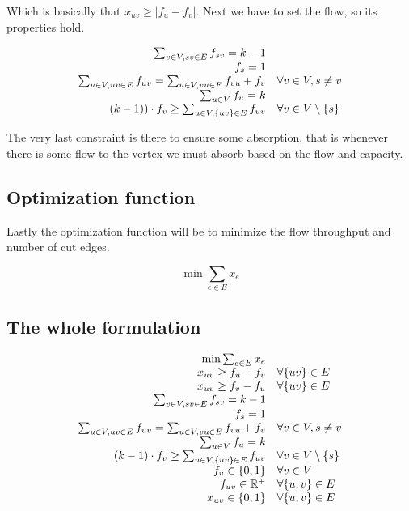 \documentclass{article}
\theoremstyle{plain}
\theoremstyle{plain}
\theoremstyle{remark}
\begin{document}
	Which is basically that $x_{uv} \geq |f_u - f_v|$. Next we have to set the flow, so its properties hold.
	
	$$
	\begin{array}{r l}
		\sum_{v \in V, sv \in E} f_{sv} = k-1 \\
		f_s = 1 \\
		\sum_{u \in V, uv \in E} f_{uv} = \sum_{u \in V, vu \in E} f_{vu} + f_v & \forall v \in V, s \neq v \\
		\sum_{u \in V} f_u = k \\
		(k-1)) \cdot f_{v} \geq \sum_{u \in V, \{uv\} \in E} f_{uv} & \forall v \in V \setminus \{s\}
	\end{array}
	$$
	
	The very last constraint is there to ensure some absorption, that is whenever there is some flow to the vertex we must absorb based on the flow and capacity.
	
	\subsection{Optimization function}
	
	Lastly the optimization function will be to minimize the flow throughput and number of cut edges.
	
	$$
	\min \sum_{e \in E} x_e %
	$$
	
	\subsection{The whole formulation}
	
	\begin{equation}
		\begin{array}{r l}
			\min \sum_{e \in E} x_e \\
			x_{uv} \geq f_u - f_v & \forall \{uv\} \in E\\
			x_{uv} \geq f_v - f_u & \forall \{uv\} \in E\\
			\sum_{v \in V, sv \in E} f_{sv} = k-1 \\
			f_s = 1 \\
			\sum_{u \in V, uv \in E} f_{uv} = \sum_{u \in V, vu \in E} f_{vu} + f_v & \forall v \in V, s \neq v \\
			\sum_{u \in V} f_u = k \\
			(k-1) \cdot f_{v} \geq \sum_{u \in V, \{uv\} \in E} f_{uv} & \forall v \in V \setminus \{s\} \\
			f_v \in \{0,1\} & \forall v \in V \\
			f_{uv} \in \mathbb{R}^+ & \forall \{u,v\} \in E \\
			x_{uv} \in \{0,1\} & \forall \{u,v\} \in E
		\end{array}
	\end{equation}
	
\end{document}
